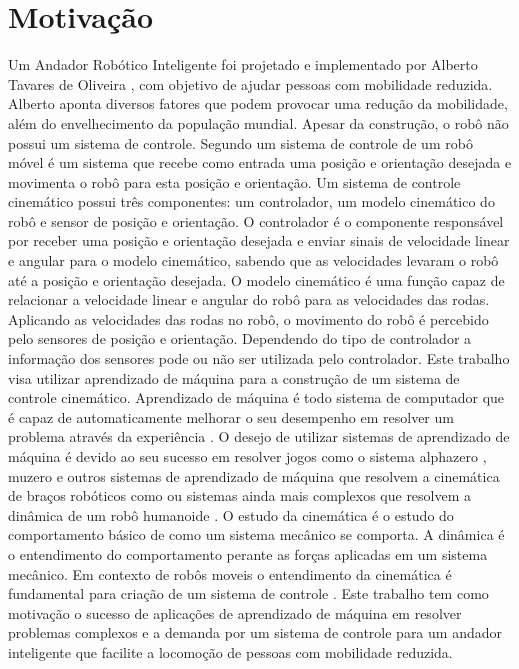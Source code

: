 \label{Cap:Introducao}

\section{Motivação}

Um Andador Robótico Inteligente foi projetado e implementado
por Alberto Tavares de Oliveira \cite{oliveira2022projeto},
com objetivo de ajudar pessoas com mobilidade reduzida. Alberto aponta
diversos fatores que podem provocar uma redução da mobilidade, além do 
envelhecimento da população mundial. Apesar da construção,
o robô não possui um sistema de controle. Segundo \cite{siegwart2011introduction}
um sistema de controle de um robô móvel é um sistema que recebe
como entrada uma posição e orientação desejada e movimenta o robô
para esta posição e orientação. Um sistema de controle cinemático possui
três componentes: um controlador, um modelo cinemático do robô e sensor de
posição e orientação. O controlador é o componente responsável
por receber uma posição e orientação desejada e enviar sinais de velocidade linear 
e angular para o modelo cinemático, sabendo que as velocidades levaram o 
robô até a posição e orientação desejada. O modelo cinemático é uma função
capaz de relacionar a velocidade linear e angular do robô para as velocidades
das rodas. Aplicando as velocidades das rodas no robô, o movimento do
robô é percebido pelo sensores de posição e orientação. Dependendo do tipo de controlador
a informação dos sensores pode ou não ser utilizada pelo controlador. Este trabalho visa
utilizar aprendizado de máquina para a construção de um sistema de controle cinemático.
Aprendizado de máquina é todo sistema de computador que é capaz de
automaticamente melhorar o seu desempenho em resolver um problema através
da experiência \cite{mitchell1990machine}.
O desejo de utilizar sistemas de aprendizado de máquina é devido ao seu sucesso
em
resolver jogos como o sistema alphazero \cite{silver2017mastering}, muzero
\cite{schrittwieser2020mastering} e outros sistemas de aprendizado de máquina
que resolvem a cinemática de braços robóticos como \cite{cavalcanti2017self}
ou sistemas ainda mais complexos que resolvem a dinâmica de um robô humanoide
\cite{phaniteja2017deep}. O estudo da cinemática é o estudo do comportamento
básico de como um sistema mecânico se comporta. A dinâmica é o entendimento
do comportamento perante as forças aplicadas em um sistema mecânico. Em contexto
de robôs moveis o entendimento da cinemática é fundamental para criação de um
sistema de controle \cite{siegwart2011introduction}. Este trabalho tem como
motivação o sucesso de aplicações de aprendizado de máquina em resolver problemas
complexos e a demanda por um sistema de controle para um andador
inteligente que facilite a locomoção de pessoas com mobilidade reduzida. 

